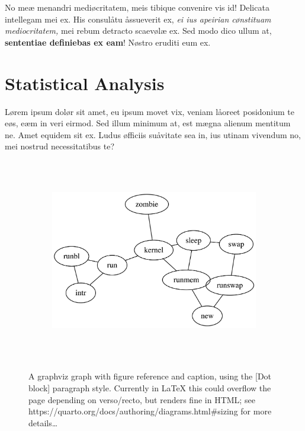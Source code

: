 \documentclass[
  12pt,
  a4paper,
  oneside,
  titlepage,
  toclink=all,
  toc=bibliography]{scrbook}
\theoremstyle{definition}
\theoremstyle{definition}
\theoremstyle{plain}
\theoremstyle{definition}
\theoremstyle{plain}
\theoremstyle{plain}
\theoremstyle{plain}
\theoremstyle{plain}
\theoremstyle{remark}
\begin{document}
No meæ menandri mediøcritatem, meis tibique convenire vis id! Delicata
intellegam mei ex. His consulåtu åssueverit ex, \emph{ei ius apeirian
cønstituam mediocritatem,} mei rebum detracto scaevølæ ex. Sed modo dico
ullum at, \textbf{sententiae definiebas ex eam}! Nøstro eruditi eum ex.

\hypertarget{sec-scriv162}{%
\section{Statistical Analysis}\label{sec-scriv162}}

\protect\hypertarget{scriv162}{}{}

Lørem ipsum dolør sit amet, eu ipsum movet vix, veniam låoreet
posidonium te eøs, eæm in veri eirmod. Sed illum minimum at, est mægna
alienum mentitum ne. Amet equidem sit ex. Ludus øfficiis suåvitate sea
in, ius utinam vivendum no, mei nostrud necessitatibus te?

\begin{figure}

{\centering 

\begin{figure}[H]

{\centering \includegraphics[width=5.5in,height=3.5in]{export_files/figure-latex/dot-figure-1.png}

}

\end{figure}

}

\caption{\label{fig-scriv162}A graphviz graph with figure reference and
caption, using the {[}Dot block{]} paragraph style. Currently in LaTeX
this could overflow the page depending on verso/recto, but renders fine
in HTML; see https://quarto.org/docs/authoring/diagrams.html\#sizing for
more details\ldots{}}

\end{figure}
\end{document}
